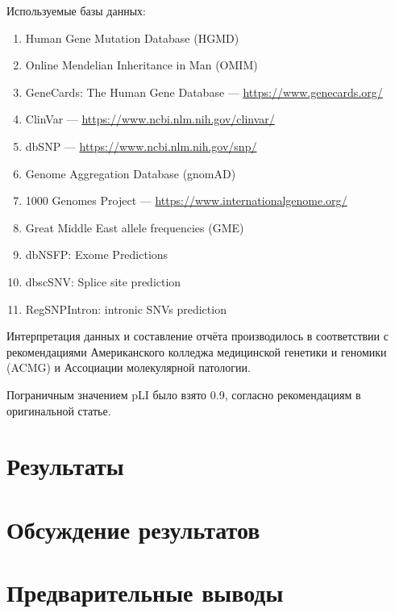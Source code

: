 \documentclass[a4paper,12pt]{article}
\begin{document}
Используемые базы данных:

\begin{enumerate}
\item Human Gene Mutation Database (HGMD\textregistered)\cite{hgmd}
\item Online Mendelian Inheritance in Man (OMIM\textregistered)\cite{omim}
\item GeneCards\textregistered: The Human Gene Database --- \href{https://www.genecards.org/}{https://www.genecards.org/}
\item ClinVar --- \href{https://www.ncbi.nlm.nih.gov/clinvar/}{https://www.ncbi.nlm.nih.gov/clinvar/}
\item dbSNP --- \href{https://www.ncbi.nlm.nih.gov/snp/}{https://www.ncbi.nlm.nih.gov/snp/}
\item Genome Aggregation Database (gnomAD)\cite{gnomad}
\item 1000 Genomes Project --- \href{https://www.internationalgenome.org/}{https://www.internationalgenome.org/}
\item Great Middle East allele frequencies (GME)\cite{gme}
\item dbNSFP: Exome Predictions\cite{dbnsfp}
\item dbscSNV: Splice site prediction\cite{dbscsnv}
\item RegSNPIntron: intronic SNVs prediction\cite{regsnpintron}
\end{enumerate}

Интерпретация данных и составление отчёта производилось в соответствии с рекомендациями Американского колледжа медицинской генетики и геномики (ACMG) и Ассоциации молекулярной патологии\cite{richards}.

Пограничным значением pLI было взято 0.9, согласно рекомендациям в оригинальной статье\cite{lek}.

\section{Результаты}

\section{Обсуждение результатов}

\section{Предварительные выводы}

\appendix
\end{document}
